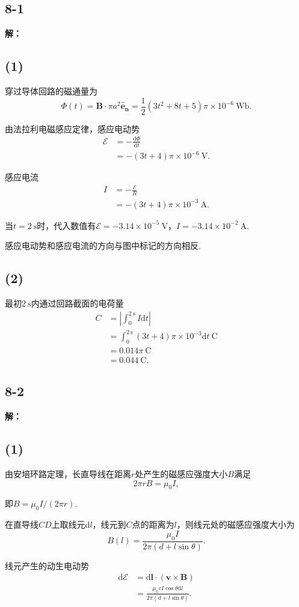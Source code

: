 \documentclass[twocolumn]{ctexart}
\newcommand{\sol}[1]{\subsection*{#1}\noindent\textbf{解：}
	
}
\begin{document}
	\sol{8-1}
	\subsection*{(1)}
	穿过导体回路的磁通量为
	$$\Phi(t)=\mathbf{B}\cdot\pi a^2\mathbf{\hat e_n}=\frac{1}{2}\left(3t^2+8t+5\right)\pi\times10^{-6}\ \mathrm{Wb}.$$
	
	由法拉利电磁感应定律，感应电动势
	\begin{align*}
		\mathscr{E}&=-\frac{\mathrm{d}\Phi}{\mathrm{d}t}\\
		&=-\left(3t+4\right)\pi\times10^{-6}\ \mathrm{V}.		
	\end{align*}

	感应电流
	\begin{align*}
		I&=-\frac{\mathscr{E}}{R}\\
		&=-\left(3t+4\right)\pi\times10^{-3}\ \mathrm{A}.
	\end{align*}
	
	当$t=2\ \mathrm{s}$时，代入数值有$\mathscr{E}=-3.14\times10^{-5}\ \mathrm{V}$，$I=-3.14\times10^{-2}\ \mathrm{A}$.
	
	感应电动势和感应电流的方向与图中标记的方向相反.
	\subsection*{(2)}
	最初$2\ \mathrm s$内通过回路截面的电荷量
	\begin{align*}
		C&=\left|\int_{0}^{2\ \mathrm s}I\mathrm{d}t\right|\\
		&=\int_{0}^{2\ \mathrm s}\left(3t+4\right)\pi\times10^{-3}\mathrm{d}t\ \mathrm{C}\\
		&=0.014\pi\ \mathrm{C}\\
		&=0.044\ \mathrm{C}.
	\end{align*}
	
	\sol{8-2}
	\subsection*{(1)}
	由安培环路定理，长直导线在距离$r$处产生的磁感应强度大小$B$满足
	$$2\pi rB=\mu_0I,$$
	
	即$B=\mu_0I/\left(2\pi r\right)$.
	
	在直导线$CD$上取线元$\mathrm{d}l$，线元到$C$点的距离为$l$，则线元处的磁感应强度大小为
	$$B(l)=\frac{\mu_0I}{2\pi\left(d+l\sin\theta\right)}.$$
	
	线元产生的动生电动势
	\begin{align}
		\mathrm{d}\mathscr{E}&=\mathrm{d}\mathbf{l}\cdot\left(\mathbf{v}\times\mathbf{B}\right)\\
		&=\frac{\mu_0vI\cos\theta\mathrm{d}l}{2\pi\left(d+l\sin\theta\right)}.
	\end{align}
	
\end{document}
